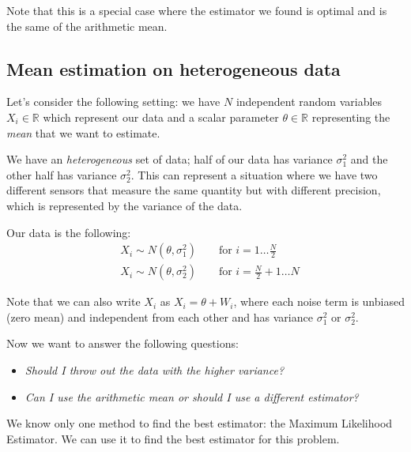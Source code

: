 Note that this is a special case where the estimator we found is optimal and is the same of the arithmetic mean.

\subsection{Mean estimation on heterogeneous data}

Let's consider the following setting: we have $N$ independent random variables $X_i \in \mathbb{R}$ which represent our data and a scalar parameter $\theta \in \mathbb{R}$ representing the \textit{mean} that we want to estimate.

We have an \textit{heterogeneous} set of data; half of our data has variance $\sigma_1^2$ and the other half has variance $\sigma_2^2$. This can represent a situation where we have two different sensors that measure the same quantity but with different precision, which is represented by the variance of the data.

Our data is the following:
\begin{align*}
     & X_i \sim N(\theta, \sigma_1^2) \qquad \text{for } i = 1 \dots \frac{N}{2}     \\
     & X_i \sim N(\theta, \sigma_2^2) \qquad \text{for } i = \frac{N}{2} + 1 \dots N
\end{align*}

Note that we can also write $X_i$ as $X_i = \theta + W_i$, where each noise term is unbiased (zero mean) and independent from each other and has variance $\sigma_1^2$ or $\sigma_2^2$.

Now we want to answer the following questions:
\begin{itemize}
    \item \textit{Should I throw out the data with the higher variance?}
    \item \textit{Can I use the arithmetic mean or should I use a different estimator?}
\end{itemize}

We know only one method to find the best estimator: the Maximum Likelihood Estimator. We can use it to find the best estimator for this problem.

